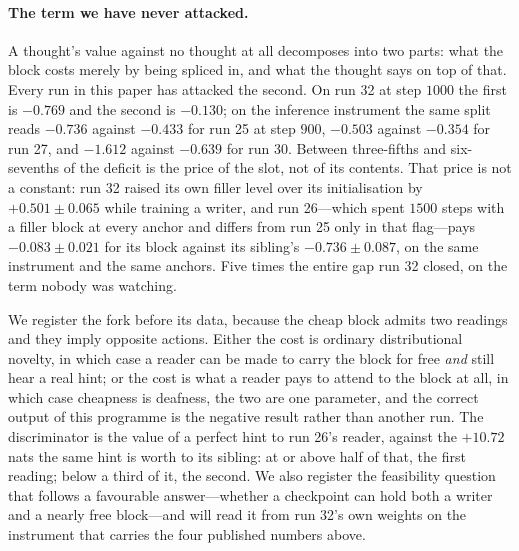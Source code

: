 \documentclass{article} %
\begin{document}
\paragraph{The term we have never attacked.} A thought's value against no thought at all decomposes
into two parts: what the block costs merely by being spliced in, and what the thought says on top of
that. Every run in this paper has attacked the second. On run 32 at step $1000$ the first is
$-0.769$ and the second is $-0.130$; on the inference instrument the same split reads $-0.736$
against $-0.433$ for run 25 at step $900$, $-0.503$ against $-0.354$ for run 27, and $-1.612$ against
$-0.639$ for run 30. Between three-fifths and six-sevenths of the deficit is the price of the slot,
not of its contents. That price is not a constant: run 32 raised its own filler level over its
initialisation by $+0.501 \pm 0.065$ while training a writer, and run 26---which spent $1500$ steps
with a filler block at every anchor and differs from run 25 only in that flag---pays
$-0.083 \pm 0.021$ for its block against its sibling's $-0.736 \pm 0.087$, on the same instrument and
the same anchors. Five times the entire gap run 32 closed, on the term nobody was watching.

We register the fork before its data, because the cheap block admits two readings and they imply
opposite actions. Either the cost is ordinary distributional novelty, in which case a reader can be
made to carry the block for free \emph{and} still hear a real hint; or the cost is what a reader pays
to attend to the block at all, in which case cheapness is deafness, the two are one parameter, and
the correct output of this programme is the negative result rather than another run. The discriminator
is the value of a perfect hint to run 26's reader, against the $+10.72$ nats the same hint is worth to
its sibling: at or above half of that, the first reading; below a third of it, the second. We also
register the feasibility question that follows a favourable answer---whether a checkpoint can hold
both a writer and a nearly free block---and will read it from run 32's own weights on the instrument
that carries the four published numbers above.
\end{document}
